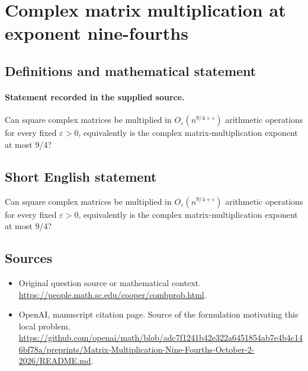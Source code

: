 \documentclass[11pt]{article}
\begin{document}
\section*{Complex matrix multiplication at exponent nine-fourths}\label{statement}
\subsection{Definitions and mathematical statement}
\paragraph{Statement recorded in the supplied source.}
Can square complex matrices be multiplied in $O_\varepsilon (n^{9/4+\varepsilon })$ arithmetic operations for every fixed $\varepsilon >0$, equivalently is the complex matrix-multiplication exponent at most 9/4?
\subsection{Short English statement}
Can square complex matrices be multiplied in $O_\varepsilon (n^{9/4+\varepsilon })$ arithmetic operations for every fixed $\varepsilon >0$, equivalently is the complex matrix-multiplication exponent at most 9/4?
\subsection{Sources}
\begin{itemize}
\item[S1] Original question source or mathematical context.
\url{https://people.math.sc.edu/cooper/combprob.html}.
\item[S2] OpenAI, manuscript citation page. Source of the formulation motivating this local problem.
\url{https://github.com/openai/math/blob/adc7f1241b42e322a6451854ab7e4b4c146bf78a/preprints/Matrix-Multiplication-Nine-Fourths-October-2-2026/README.md}.
\end{itemize}
\end{document}
